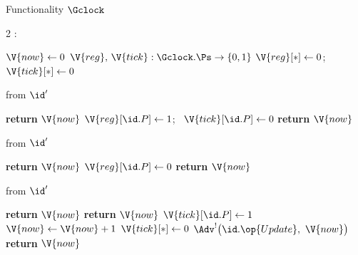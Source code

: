 \begin{interface}[nofloat]{Functionality $\Gclock$ \\
}

{\scriptsize
\setlength{\columnsep}{1.4em}
\begin{multicols}{2}
:
\begin{algorithmic}[1]
\setcounter{contline}{0}\algcont
\State $\V{now} \gets 0$
\State $\V{reg},\, \V{tick} : \Gclock.\Ps \to \{0,1\}$
\State $\V{reg}[*] \gets 0$; \ $\V{tick}[*] \gets 0$
\algsave
\end{algorithmic}
\vspace{1.4ex}

 \quad from $\id'$
\begin{algorithmic}[1]
\algcont
{}
  \State \textbf{return} $\V{now}$
\EndIf
\State $\V{reg}[\id.P] \gets 1$; \ $\V{tick}[\id.P] \gets 0$
\State \textbf{return} $\V{now}$
\algsave
\end{algorithmic}
\vspace{1.4ex}

 \quad from $\id'$
\begin{algorithmic}[1]
\algcont
{}
  \State \textbf{return} $\V{now}$
\EndIf
\State $\V{reg}[\id.P] \gets 0$
\State \textbf{return} $\V{now}$
\algsave
\end{algorithmic}
\vspace{1.4ex}

\columnbreak

 \quad from $\id'$
\begin{algorithmic}[1]
\algcont
{}
  \State \textbf{return} $\V{now}$ \label{ln:clockaz}
\EndIf
{}
  \State \textbf{return} $\V{now}$
\EndIf
\State $\V{tick}[\id.P] \gets 1$
 \label{ln:advance}
  \State $\V{now} \gets \V{now} + 1$
  \State $\V{tick}[*] \gets 0$
\EndIf
\State $\Adv^{!}\bigl(\id.\op{Update},\ \V{now}\bigr)$ \label{ln:clocknotify}
\State \textbf{return} $\V{now}$
\algsave
\end{algorithmic}
\vspace{1.4ex}


\end{multicols}}
\end{interface}
